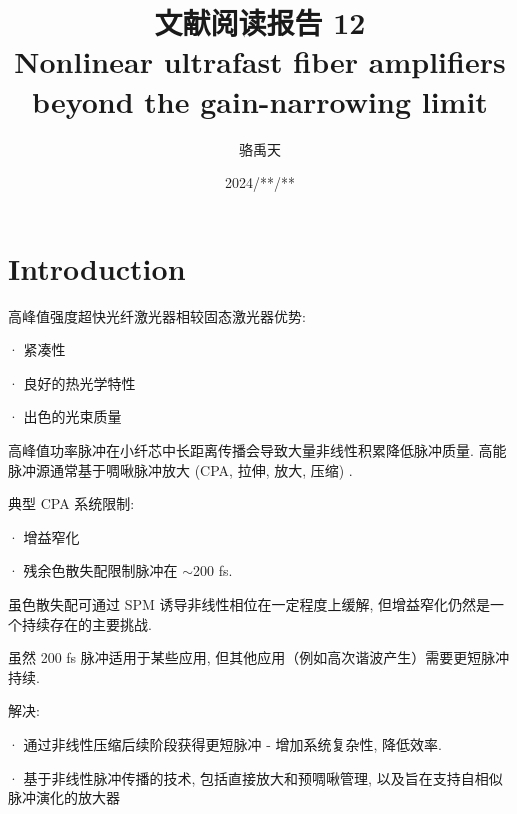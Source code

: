 \documentclass[14pt,a4paper,oneside]{article}
\title{\textbf{文献阅读报告 12\\Nonlinear ultrafast fiber amplifiers beyond the gain-narrowing limit}\cite{sidorenkoNonlinearUltrafastFiber2019}}                           %
\author{骆禹天}                                           %
\date{2024/**/**}                                        %
\begin{document}

\maketitle

\setcounter{page}{1}          %


\tableofcontents              %

\newpage
\setcounter{page}{1}          %







\section{Introduction}

高峰值强度超快光纤激光器相较固态激光器优势:

· 紧凑性

· 良好的热光学特性

· 出色的光束质量

高峰值功率脉冲在小纤芯中长距离传播会导致大量非线性积累降低脉冲质量. 高能脉冲源通常基于啁啾脉冲放大 (CPA, 拉伸, 放大, 压缩) . 

典型 CPA 系统限制:

· 增益窄化\cite{weizhaoFemtosecondpulseFiberBased2014}

· 残余色散失配限制脉冲在 $\sim$200 fs. 

虽色散失配可通过 SPM 诱导非线性相位\cite{zhouCompensationNonlinearPhase2005}在一定程度上缓解, 但增益窄化仍然是一个持续存在的主要挑战. 

虽然 200 fs 脉冲适用于某些应用, 但其他应用（例如高次谐波产生）需要更短脉冲持续. 

解决: 

· 通过非线性压缩后续阶段获得更短脉冲 - 增加系统复杂性, 降低效率. 

· 基于非线性脉冲传播的技术, 包括直接放大\cite{zaouterStretcherfreeHighEnergy2008}和预啁啾管理\cite{liuPrechirpManagedNonlinear2015}, 以及旨在支持自相似脉冲演化的放大器\cite{andersonWavebreakingfreePulsesNonlinearoptical1993, kruglovSelfsimilarPropagationHighpower2000, fermannSelfsimilarPropagationAmplification2000}
\end{document}
